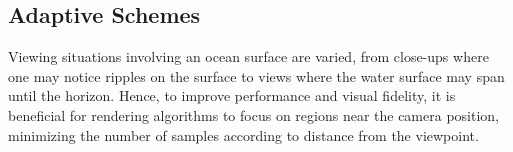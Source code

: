 
\subsection{Adaptive Schemes}
Viewing situations involving an ocean surface are varied, from close-ups where
one may notice ripples on the surface to views where the water surface may
span until the horizon. Hence, to improve performance and visual fidelity,
it is beneficial for rendering algorithms to focus on regions near the camera
position, minimizing the number of samples according to distance from the
viewpoint.
%

